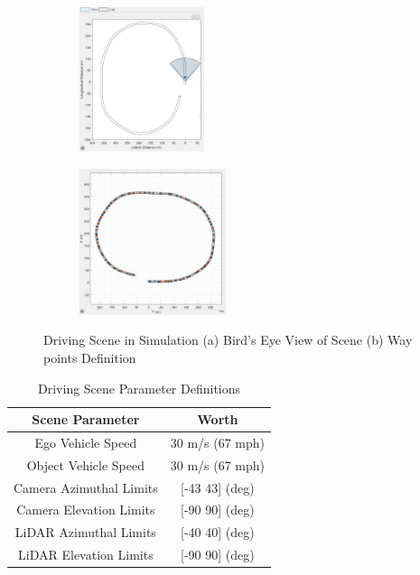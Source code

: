\begin{figure}
    \centering
    \begin{subfigure}[]
        \centering
        \includegraphics[width=0.4\textwidth]{Images/Drivingscene.png}
    \end{subfigure}
    \begin{subfigure}[]
        \centering
        \includegraphics[width=0.47\textwidth]{Images/waypoints.png}
    \end{subfigure}
    \caption{Driving Scene in Simulation (a) Bird's Eye View of Scene (b) Way points Definition}
    \label{Drivingscene}
\end{figure}

\begin{table}
    \centering
    \begin{tabular}{|c|c|}
        \hline
        \textbf{Scene Parameter} & \textbf{Worth} \\
        \hline
        Ego Vehicle Speed & 30 m/s (67 mph)\\
        \hline
        Object Vehicle Speed & 30 m/s (67 mph)\\
        \hline
        Camera Azimuthal Limits & [-43 43] (deg) \\
        \hline
        Camera Elevation Limits & [-90 90] (deg)\\
        \hline  
        LiDAR Azimuthal Limits & [-40 40] (deg)\\
        \hline
        LiDAR Elevation Limits & [-90 90] (deg)\\
        \hline
    \end{tabular}
    \caption{Driving Scene Parameter Definitions}
    \label{paramsdrivingscene}
\end{table}

